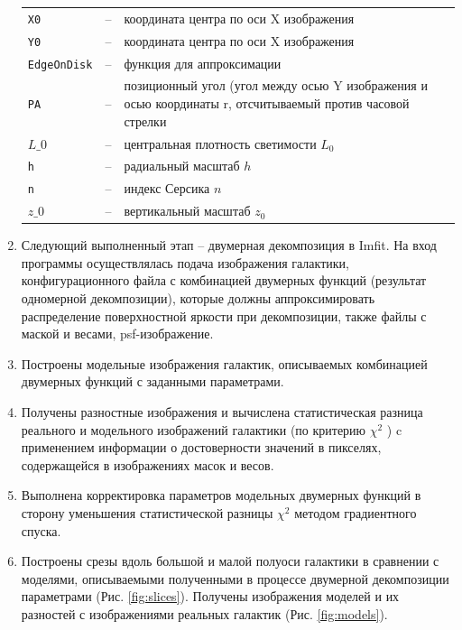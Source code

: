 \begin{enumerate}
    \begin{tabular}{p{40mm}p{5mm}p{90mm}}
    
    \texttt{X0} & -- & координата центра по оси X изображения  \\
    \texttt{Y0} & -- & координата центра по оси X изображения \\
    \texttt{EdgeOnDisk} & -- &функция для аппроксимации \\
    \texttt{PA} & -- &позиционный угол (угол между осью Y изображения и осью координаты r, отсчитываемый против часовой стрелки  \\
    \texttt{$L\_0$} & -- &центральная плотность светимости $L_0$ \\
    \texttt{h} & -- & радиальный масштаб $h$ \\
    \texttt{n} & -- & индекс Серсика $n$ \\
    \texttt{$z\_0$} & -- & вертикальный масштаб $z_0$
    \end{tabular}

    \item Следующий выполненный этап -- двумерная декомпозиция в Imfit\cite{2015ApJ...799..226E}. На вход программы осуществлялась подача изображения галактики, конфигурационного файла с комбинацией двумерных функций (результат одномерной декомпозиции), которые должны аппроксимировать распределение поверхностной яркости при декомпозиции, также файлы с маской и весами, psf-изображение.
    \item Построены модельные изображения галактик, описываемых комбинацией двумерных функций с заданными параметрами.
    \item Получены разностные изображения и вычислена статистическая разница реального и модельного изображений галактики (по критерию $\chi^2$ ) c применением информации о достоверности значений
в пикселях, содержащейся в изображениях масок и весов.
    \item Выполнена корректировка параметров модельных двумерных функций в сторону уменьшения статистической разницы $\chi^2$ методом градиентного спуска.
    \item Построены срезы вдоль большой и малой полуоси галактики в сравнении с моделями, описываемыми полученными в процессе двумерной декомпозиции параметрами (Рис. \ref{fig:slices}). Получены изображения моделей и их разностей с изображениями реальных галактик (Рис. \ref{fig:models}).
    
\end{enumerate}

